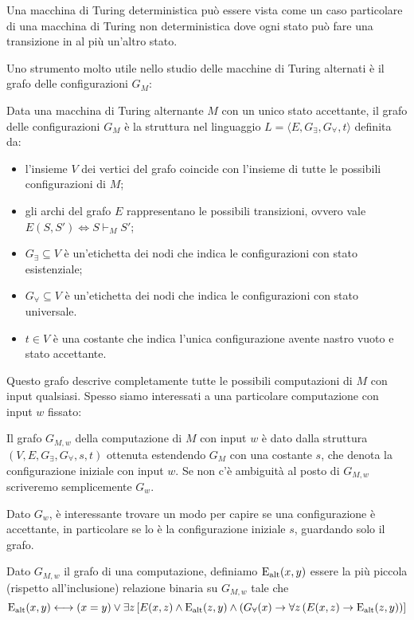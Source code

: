 \begin{osservazione}
 Una macchina di Turing deterministica può essere vista come un caso particolare
 di una macchina di Turing non deterministica dove ogni
 stato può fare una transizione in al più un'altro stato.
\end{osservazione}

Uno strumento molto utile nello studio delle macchine di Turing alternati è
il grafo delle configurazioni $G_M$:

\begin{definizione}
 Data una macchina di  Turing alternante $M$ con un unico stato accettante,
 il grafo delle configurazioni $G_M$
 è la struttura nel linguaggio $L=\langle E, G_\exists, G_\forall, t\rangle$
 definita da:
 \begin{itemize}
  \item l'insieme $V$ dei vertici del grafo coincide con l'insieme di tutte le
  possibili configurazioni di $M$;
  \item gli archi del grafo $E$ rappresentano le possibili transizioni, ovvero
  vale $E(S,S') \iff S \vdash_M S'$;
  \item $G_\exists \subseteq V$ è un'etichetta dei nodi che indica le configurazioni
  con stato esistenziale;
  \item $G_\forall \subseteq V$ è un'etichetta dei nodi che indica le configurazioni
  con stato universale.
  \item $t \in V$ è una costante che indica l'unica configurazione avente nastro
  vuoto e stato accettante.
 \end{itemize}
\end{definizione}
Questo grafo descrive completamente tutte le possibili computazioni di $M$ con
input qualsiasi. Spesso siamo interessati a una particolare computazione
con input $w$ fissato:
\begin{definizione}
 Il grafo $G_{M,w}$
 della computazione di $M$ con input $w$ è dato dalla
 struttura $(V,E, G_\exists, G_\forall, s, t)$ ottenuta estendendo $G_M$
 con una costante $s$, che denota la configurazione iniziale con input $w$.
 Se non c'è ambiguità al posto di $G_{M,w}$ scriveremo semplicemente $G_w$.
\end{definizione}
Dato $G_w$, è interessante trovare un modo per capire se una configurazione
è accettante, in particolare se lo è la configurazione iniziale $s$, guardando
solo il grafo.
\begin{definizione}
 Dato $G_{M,w}$ il grafo di una computazione,
 definiamo $\operatorname{E_{alt}}(x,y)$ essere la
 più piccola (rispetto all'inclusione) relazione binaria su $G_{M,w}$ tale che
 \[
  \operatorname{E_{alt}}(x,y) \longleftrightarrow (x=y) \lor \exists z 
  \left[ E(x,z) \land \operatorname{E_{alt}}(z,y) \land (G_\forall(x) \rightarrow \forall z\left(E(x,z) \rightarrow \operatorname{E_{alt}}(z,y)\right)\right]
 \]
\end{definizione}
